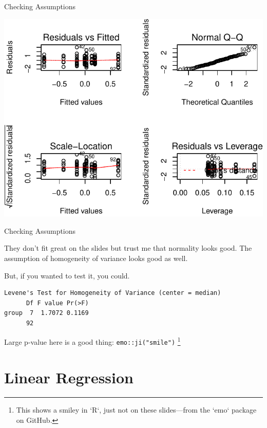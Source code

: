 \begin{frame}{Checking Assumptions}

\includegraphics{04_BasicAnalyses_files/figure-beamer/unnamed-chunk-17-1.pdf}

\end{frame}

\begin{frame}[fragile]{Checking Assumptions}

They don't fit great on the slides but trust me that normality looks
good. The assumption of homogeneity of variance looks good as well.

But, if you wanted to test it, you could.

\begin{Shaded}
\begin{Highlighting}[]
\end{Highlighting}
\end{Shaded}

\begin{verbatim}
Levene's Test for Homogeneity of Variance (center = median)
      Df F value Pr(>F)
group  7  1.7072 0.1169
      92               
\end{verbatim}

Large p-value here is a good thing: \texttt{emo::ji("smile")}
\footnote{This shows a smiley in `R`, just not on these slides---from the `emo` package on GitHub.}

\end{frame}

\section{Linear Regression}\label{linear-regression}

